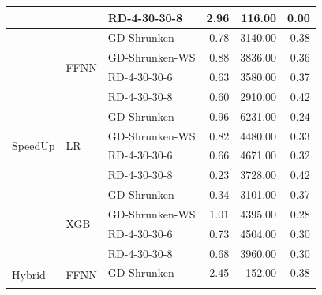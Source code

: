 \begin{table}[ht]
\begin{tabular}{lllrrr}
		                             &                          & RD-4-30-30-8     & 2.96         & 116.00              & 0.00                    \\\midrule
		\multirow[t]{12}{*}{SpeedUp} & \multirow[t]{4}{*}{FFNN} & GD-Shrunken      & 0.78         & 3140.00             & 0.38                    \\\cmidrule(lr){3-6}
		                             &                          & GD-Shrunken-WS   & 0.88         & 3836.00             & 0.36                    \\\cmidrule(lr){3-6}
		                             &                          & RD-4-30-30-6     & 0.63         & 3580.00             & 0.37                    \\\cmidrule(lr){3-6}
		                             &                          & RD-4-30-30-8     & 0.60         & 2910.00             & 0.42                    \\\cmidrule(lr){2-6}
		                             & \multirow[t]{4}{*}{LR}   & GD-Shrunken      & 0.96         & 6231.00             & 0.24                    \\\cmidrule(lr){3-6}
		                             &                          & GD-Shrunken-WS   & 0.82         & 4480.00             & 0.33                    \\\cmidrule(lr){3-6}
		                             &                          & RD-4-30-30-6     & 0.66         & 4671.00             & 0.32                    \\\cmidrule(lr){3-6}
		                             &                          & RD-4-30-30-8     & 0.23         & 3728.00             & 0.42                    \\\cmidrule(lr){2-6}
		                             & \multirow[t]{4}{*}{XGB}  & GD-Shrunken      & 0.34         & 3101.00             & 0.37                    \\\cmidrule(lr){3-6}
		                             &                          & GD-Shrunken-WS   & 1.01         & 4395.00             & 0.28                    \\\cmidrule(lr){3-6}
		                             &                          & RD-4-30-30-6     & 0.73         & 4504.00             & 0.30                    \\\cmidrule(lr){3-6}
		                             &                          & RD-4-30-30-8     & 0.68         & 3960.00             & 0.30                    \\\midrule
		\multirow[t]{12}{*}{Hybrid}  & \multirow[t]{4}{*}{FFNN} & GD-Shrunken      & 2.45         & 152.00              & 0.38                    \\\cmidrule(lr){3-6}

\end{tabular}
\end{table}
